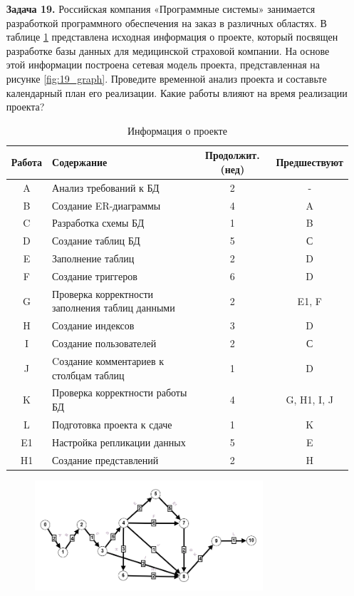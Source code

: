 \documentclass{article}
\begin{document}
\clearpage%
\begin{enumerate}
\item[\textbf{Задача 19.}]  Российская компания «Программные системы» занимается разработкой программного обеспечения на заказ в различных областях. В таблице \ref{tab:19_table} представлена исходная информация о проекте, который посвящен разработке базы данных для медицинской страховой компании. На основе этой информации построена сетевая модель проекта, представленная на рисунке \ref{fig:19_graph}. Проведите временной анализ проекта и составьте календарный план его реализации. Какие работы влияют на время реализации проекта?
\begin{table}[ht]
    \centering
    \begin{tabular}{|c|l|c|c|}
    \hline
        Работа & Содержание & Продолжит. (нед) & Предшествуют \\ \hline
        A & Анализ требований к БД & 2 & - \\ \hline
        B & Создание ER-диаграммы & 4 & A \\ \hline
        C & Разработка схемы БД & 1 & B \\ \hline
        D & Создание таблиц БД & 5 & С \\ \hline
        E & Заполнение таблиц & 2 & D \\ \hline
        F & Создание триггеров & 6 & D \\ \hline
        G & Проверка корректности заполнения таблиц данными & 2 & E1, F \\ \hline
        H & Создание индексов & 3 & D \\ \hline
        I & Создание пользователей & 2 & С \\ \hline
        J & Cоздание комментариев к столбцам таблиц & 1 & D \\ \hline
        K & Проверка корректности работы БД & 4 & G, H1, I, J \\ \hline
        L & Подготовка проекта к сдаче & 1 & K \\ \hline
        E1 & Настройка репликации данных & 5 & E \\ \hline
        H1 & Создание представлений & 2 & H \\ \hline
    \end{tabular}
    \caption{Информация о проекте}
    \label{tab:19_table}
\end{table}
\begin{figure}[ht]
    \centering
    \includegraphics[width=0.8\textwidth, center]{attachments/19/19_0.png}

\end{figure}
\end{enumerate}
\end{document}
